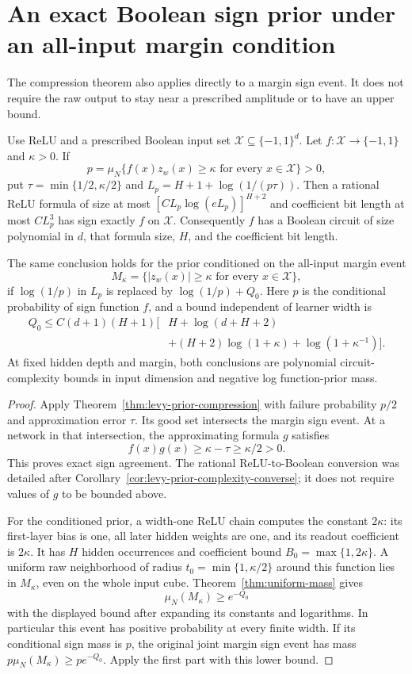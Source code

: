 \section{An exact Boolean sign prior under an all-input margin condition}
\label{sec:levy-margin-converse}
The compression theorem also applies directly to a margin sign event. It does not require the raw output to stay near a prescribed amplitude or to have an upper bound.

\begin{theorem}
\label{thm:margin-sign-converse}
Use ReLU and a prescribed Boolean input set $\mathcal X\subseteq\{-1,1\}^d$. Let $f:\mathcal X\to\{-1,1\}$ and $\kappa>0$. If
\[
 p=\mu_N\{f(x)z_w(x)\ge\kappa\text{ for every }x\in\mathcal X\}>0,
\]
put $\tau=\min\{1/2,\kappa/2\}$ and $L_p=H+1+\log(1/(p\tau))$. Then a rational ReLU formula of size at most
$[CL_p\log(eL_p)]^{H+2}$ and coefficient bit length at most $CL_p^3$ has sign exactly $f$ on $\mathcal X$. Consequently $f$ has a Boolean circuit of size polynomial in $d$, that formula size, $H$, and the coefficient bit length.

The same conclusion holds for the prior conditioned on the all-input margin event
\[
 M_\kappa=\{|z_w(x)|\ge\kappa\text{ for every }x\in\mathcal X\},
\]
if $\log(1/p)$ in $L_p$ is replaced by $\log(1/p)+Q_0$. Here $p$ is the conditional probability of sign function $f$, and a bound independent of learner width is
\begin{align*}
 Q_0\le C(d+1)(H+1)\big[&H+\log(d+H+2)\\
 &+(H+2)\log(1+\kappa)+\log(1+\kappa^{-1})\big].
\end{align*}
At fixed hidden depth and margin, both conclusions are polynomial circuit-complexity bounds in input dimension and negative log function-prior mass.
\end{theorem}
\begin{proof}
Apply Theorem~\ref{thm:levy-prior-compression} with failure probability $p/2$ and approximation error $\tau$. Its good set intersects the margin sign event. At a network in that intersection, the approximating formula $g$ satisfies
\[
 f(x)g(x)\ge\kappa-\tau\ge\kappa/2>0.
\]
This proves exact sign agreement. The rational ReLU-to-Boolean conversion was detailed after Corollary~\ref{cor:levy-prior-complexity-converse}; it does not require values of $g$ to be bounded above.

For the conditioned prior, a width-one ReLU chain computes the constant $2\kappa$: its first-layer bias is one, all later hidden weights are one, and its readout coefficient is $2\kappa$. It has $H$ hidden occurrences and coefficient bound $B_0=\max\{1,2\kappa\}$. A uniform raw neighborhood of radius $t_0=\min\{1,\kappa/2\}$ around this function lies in $M_\kappa$, even on the whole input cube. Theorem~\ref{thm:uniform-mass} gives
\[
 \mu_N(M_\kappa)\ge e^{-Q_0}
\]
with the displayed bound after expanding its constants and logarithms. In particular this event has positive probability at every finite width. If its conditional sign mass is $p$, the original joint margin sign event has mass
$p\mu_N(M_\kappa)\ge p e^{-Q_0}$. Apply the first part with this lower bound.
\end{proof}

